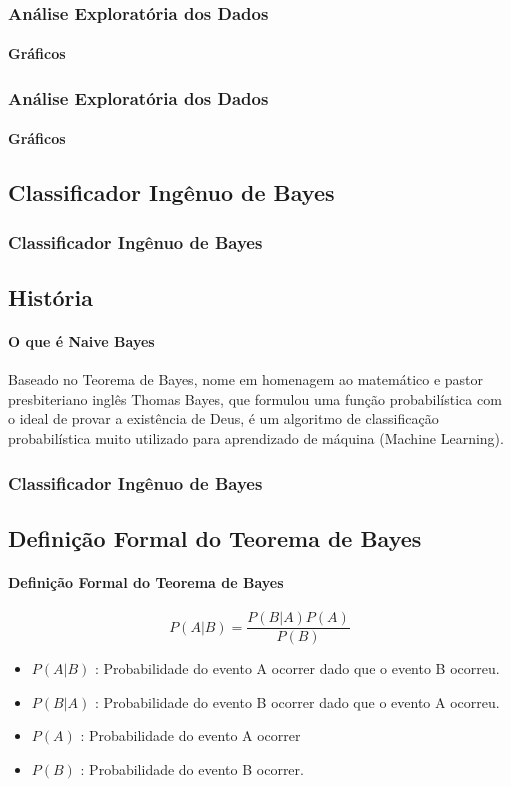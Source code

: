 \documentclass{beamer}
\begin{document}
\begin{frame}
    \frametitle{Análise Exploratória dos Dados}
    \framesubtitle{Gráficos}
    
          
\end{frame}
    
\begin{frame}
    \frametitle{Análise Exploratória dos Dados}
    \framesubtitle{Gráficos}
    
    
          
\end{frame}

\begin{frame}
    \section{Classificador Ingênuo de Bayes}
    \frametitle{Classificador Ingênuo de Bayes}
    \subsection{História}
    \framesubtitle{O que é Naive Bayes}
    
    Baseado no Teorema de Bayes, nome em homenagem ao matemático e pastor presbiteriano inglês Thomas Bayes, que formulou uma função probabilística com o ideal de provar a existência de Deus, é um algoritmo de classificação probabilística muito utilizado para aprendizado de máquina (Machine Learning).
    
\end{frame}

\begin{frame}
\frametitle{Classificador Ingênuo de Bayes}
\subsection{Definição Formal do Teorema de Bayes}
\framesubtitle{Definição Formal do Teorema de Bayes}
\begin{equation}
    P(A|B) = \frac{P(B|A)P(A)}{P(B)}
\end{equation}

\begin{itemize}
\item $P(A|B)$ : Probabilidade do evento A ocorrer dado que o evento B ocorreu.
\item $P(B|A)$ : Probabilidade do evento B ocorrer dado que o evento A ocorreu.
\item $P(A)$   : Probabilidade do evento A ocorrer
\item $P(B)$   : Probabilidade do evento B ocorrer. 
\end{itemize}

\end{frame}
\end{document}

